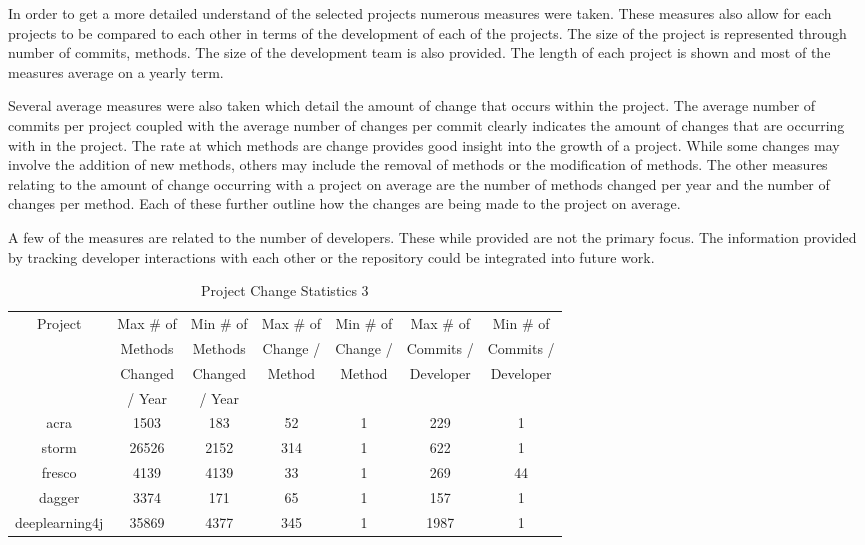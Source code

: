 In order to get a more detailed understand of the selected projects numerous measures were taken. These measures also allow for each projects to be compared to each other in terms of the development of each of the projects. The size of the project is represented through number of commits, methods. The size of the development team is also provided. The length of each project is shown and most of the measures average on a yearly term.

Several average measures were also taken which detail the amount of change that occurs within the project. The average number of commits per project coupled with the average number of changes per commit clearly indicates the amount of changes that are occurring with in the project. The rate at which methods are change provides good insight into the growth of a project. While some changes may involve the addition of new methods, others may include the removal of methods or the modification of methods. The other measures relating to the amount of change occurring with a project on average are the number of methods changed per year and the number of changes per method. Each of these further outline how the changes are being made to the project on average.

A few of the measures are related to the number of developers. These while provided are not the primary focus. The information provided by tracking developer interactions with each other or the repository could be integrated into future work.

\begin{table}
\begin{center}
    \begin{tabular}{|c|c|c|c|c|c|c|}
        \hline
        Project & Max \# of & Min \# of & Max \# of & Min \# of & Max \# of & Min \# of \\
         & Methods & Methods & Change / & Change / & Commits / & Commits / \\
         & Changed & Changed & Method & Method & Developer & Developer \\
         & / Year & / Year & & & & \\
        \hline
        acra & 1503 & 183 & 52 & 1 & 229 & 1 \\
        storm & 26526 & 2152 & 314 & 1 & 622 & 1\\
        fresco & 4139 & 4139 & 33 & 1 & 269 & 44 \\
        dagger & 3374 & 171 & 65 & 1 & 157 & 1 \\
        deeplearning4j & 35869 & 4377 & 345 & 1 & 1987 & 1 \\
        \hline
    \end{tabular}
\end{center}
\caption{Project Change Statistics 3}
\label{tab:project_stats_3}
\end{table}

